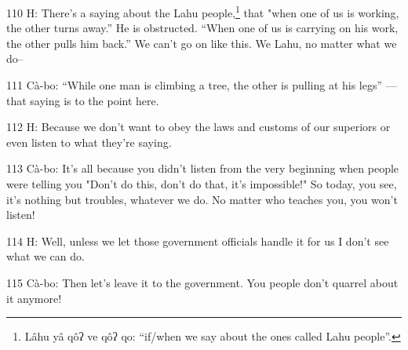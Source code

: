 110 H: There's a saying about the Lahu people,\footnote{Lâhu yâ qôʔ ve qôʔ qo: ``if/when we say about the ones called Lahu people''.} that "when one of us
is working, the other turns away.'' He is obstructed. ``When one of us is carrying
on his work, the other pulls him back.'' We can't go on like this. We Lahu, no
matter what we do--

111 Cà-bo: ``While one man is climbing a tree, the other is pulling at his legs''
--- that saying is to the point here.

112 H: Because we don't want to obey the laws and customs of our superiors or even
listen to what they're saying.

113 Cà-bo: It's all because you didn't listen from the very beginning when people
were telling you "Don't do this, don't do that, it's impossible!"
So today, you see, it's nothing but troubles, whatever we do. No matter who teaches
you, you won't listen!

114 H: Well, unless we let those government officials handle it for us I don't
see what we can do.

115 Cà-bo: Then let's leave it to the government. You people don't quarrel about
it anymore!

